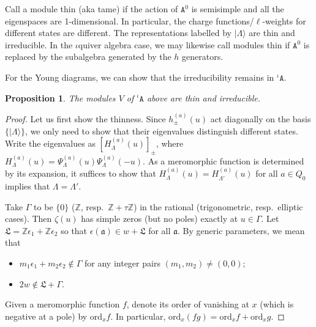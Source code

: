 \documentclass[11pt]{article}
\numberwithin{equation}{section}
\numberwithin{figure}{section}
\numberwithin{table}{section}
\newtheorem{proposition}[theorem]{Proposition}
\begin{document}
Call a module thin (aka tame) if the action of $\mathtt{A}^0$ is semisimple and all the eigenspaces are 1-dimensional. In particular, the charge functions/$\ell$-weights for different states are different. The representations labelled by $|\Lambda\rangle$ are thin and irreducible. In the $\iota$quiver algebra case, we may likewise call modules thin if $\mathtt{A}^0$ is replaced by the subalgebra generated by the $h$ generators.

For the Young diagrams, we can show that the irreducibility remains in ${}^\iota\mathtt{A}$.
\begin{proposition}\label{thinirredrep}
	The modules $V$ of ${}^\iota\mathtt{A}$ above are thin and irreducible.
\end{proposition}
\begin{proof}
	Let us first show the thinness. Since $h^{(a)}_\pm(u)$ act diagonally on the basis $\{|\Lambda\rangle\}$, we only need to show that their eigenvalues distinguish different states. Write the eigenvalues as $\left[H^{(a)}_\Lambda(u)\right]_\pm$, where $H^{(a)}_\Lambda(u)=\Psi^{(a)}_\Lambda(u)\Psi^{(a)}_\Lambda(-u)$. As a meromorphic function is determined by its expansion, it suffices to show that $H^{(a)}_\Lambda(u)=H^{(a)}_{\Lambda'}(u)$ for all $a\in Q_0$ implies that $\Lambda=\Lambda'$.

	Take $\Gamma$ to be $\{0\}$ ($\mathbb{Z}$, resp.~$\mathbb{Z}+\tau\mathbb{Z}$) in the rational (trigonometric, resp.~elliptic cases). Then $\zeta(u)$ has simple zeros (but no poles) exactly at $u\in\Gamma$. Let $\mathfrak{L}=\mathbb{Z}\epsilon_1+\mathbb{Z}\epsilon_2$ so that $\epsilon(\mathfrak{a})\in w+\mathfrak{L}$ for all $\mathfrak{a}$. By generic parameters, we mean that
	\begin{itemize}
		\item $m_1\epsilon_1+m_2\epsilon_2\notin\Gamma$ for any integer pairs $(m_1,m_2)\neq(0,0)$;
		\item $2w\notin\mathfrak{L}+\Gamma$.
	\end{itemize}
	Given a meromorphic function $f$, denote its order of vanishing at $x$ (which is negative at a pole) by $\mathrm{ord}_xf$. In particular, $\mathrm{ord}_x(fg)=\mathrm{ord}_xf+\mathrm{ord}_xg$.


\end{proof}
\end{document}
